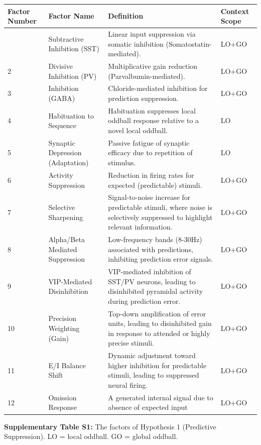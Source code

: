 \documentclass[12pt]{article}
\begin{document}
\begin{longtable}[]{@{}llll@{}}
\toprule
\textbf{Factor Number} & \textbf{Factor Name} & \textbf{Definition} & \textbf{Context Scope} \\
\midrule
\endhead
\bottomrule
\endlastfoot
1 & Subtractive Inhibition (SST) & Linear input suppression via somatic inhibition (Somatostatin-mediated). & LO+GO \\
2 & Divisive Inhibition (PV) & Multiplicative gain reduction (Parvalbumin-mediated). & LO+GO \\
3 & Inhibition (GABA) & Chloride-mediated inhibition for prediction suppression. & LO+GO \\
4 & Habituation to Sequence & Habituation suppresses local oddball response relative to a novel local oddball. & LO \\
5 & Synaptic Depression (Adaptation) & Passive fatigue of synaptic efficacy due to repetition of stimulus. & LO \\
6 & Activity Suppression & Reduction in firing rates for expected (predictable) stimuli. & LO+GO \\
7 & Selective Sharpening & Signal-to-noise increase for predictable stimuli, where noise is selectively suppressed to highlight relevant information. & LO+GO \\
8 & Alpha/Beta Mediated Suppression & Low-frequency bands (8-30Hz) associated with predictions, inhibiting prediction error signals. & LO+GO \\
9 & VIP-Mediated Disinhibition & VIP-mediated inhibition of SST/PV neurons, leading to disinhibited pyramidal activity during prediction error. & LO+GO \\
10 & Precision Weighting (Gain) & Top-down amplification of error units, leading to disinhibited gain in response to attended or highly precise stimuli. & LO+GO \\
11 & E/I Balance Shift & Dynamic adjustment toward higher inhibition for predictable stimuli, leading to suppressed neural firing. & LO+GO \\
12 & Omission Response & A generated internal signal due to absence of expected input & LO+GO \\
\end{longtable}

\textbf{Supplementary Table S1:} The factors of Hypothesis 1 (Predictive Suppression). LO = local oddball. GO = global oddball.
\end{document}
